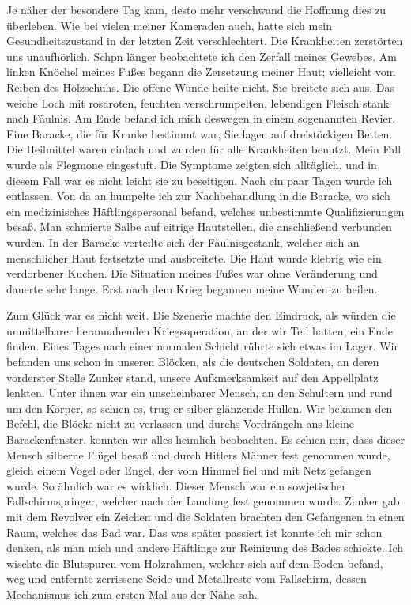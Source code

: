 \documentclass[a4paper,12pt,ngerman,
]{nisebook}
\begin{document}
Je näher der besondere Tag kam, desto mehr verschwand die Hoffnung dies zu überleben. Wie bei vielen meiner Kameraden auch, hatte sich mein Gesundheitszustand in der letzten Zeit verschlechtert. Die Krankheiten zerstörten uns unaufhörlich. Schpn länger beobachtete ich den Zerfall meines Gewebes. Am linken Knöchel meines Fußes begann die Zersetzung meiner Haut; vielleicht vom Reiben des Holzschuhs. Die offene Wunde heilte nicht. Sie breitete sich aus. Das weiche Loch mit rosaroten, feuchten verschrumpelten, lebendigen Fleisch stank nach Fäulnis. Am Ende befand ich mich deswegen in einem sogenannten Revier. Eine Baracke, die für Kranke bestimmt war, Sie lagen auf dreistöckigen Betten. Die Heilmittel waren einfach und wurden für alle Krankheiten benutzt. Mein Fall wurde als Flegmone eingestuft. Die Symptome zeigten sich alltäglich, und in diesem Fall war es nicht leicht sie zu beseitigen. Nach ein paar Tagen wurde ich entlassen. Von da an humpelte ich zur Nachbehandlung in die Baracke, wo sich ein medizinisches Häftlingspersonal befand, welches unbestimmte Qualifizierungen besaß. Man schmierte Salbe auf eitrige Hautstellen, die anschließend verbunden wurden. In der Baracke verteilte sich der Fäulnisgestank, welcher sich an menschlicher Haut festsetzte und ausbreitete. Die Haut wurde  klebrig wie ein verdorbener Kuchen. Die Situation meines Fußes war ohne Veränderung und dauerte sehr lange. Erst nach dem Krieg begannen meine Wunden zu heilen.

Zum Glück war es nicht weit. Die Szenerie machte den Eindruck, als würden die unmittelbarer herannahenden Kriegsoperation, an der wir Teil hatten, ein Ende finden. Eines Tages nach einer normalen Schicht rührte sich etwas im Lager.
Wir befanden uns schon in unseren Blöcken, als die deutschen Soldaten, an deren vorderster Stelle Zunker stand, unsere Aufkmerksamkeit auf den Appellplatz lenkten. Unter ihnen war ein unscheinbarer Mensch, an den Schultern und rund um den Körper, so schien es, trug er silber glänzende Hüllen. Wir bekamen den Befehl, die Blöcke nicht zu verlassen und durchs Vordrängeln ans kleine Barackenfenster, konnten wir alles heimlich beobachten. Es schien mir, dass dieser Mensch silberne Flügel besaß und durch Hitlers Männer fest genommen wurde, gleich einem Vogel oder Engel, der vom Himmel fiel und mit Netz gefangen  wurde. So ähnlich war es wirklich. Dieser Mensch war ein sowjetischer Fallschirmspringer, welcher nach der Landung fest genommen wurde. Zunker gab mit dem Revolver ein Zeichen und die Soldaten brachten den Gefangenen in einen Raum, welches das Bad war. Das was später passiert ist konnte ich mir schon denken, als man mich und andere Häftlinge zur Reinigung des Bades schickte. Ich wischte die Blutspuren vom Holzrahmen, welcher sich auf dem Boden befand, weg und entfernte zerrissene Seide und Metallreste vom Fallschirm, dessen Mechanismus ich zum ersten Mal aus der Nähe sah.
\end{document}

